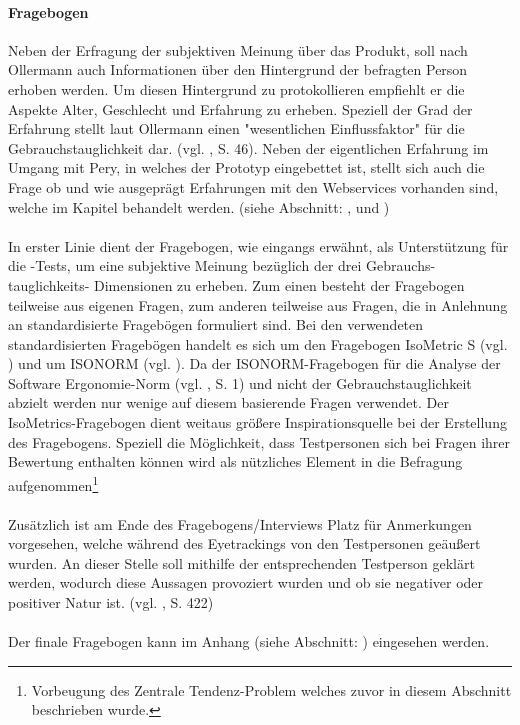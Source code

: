 \documentclass[Bachelorarbeit.tex]{subfiles}
\begin{document}
\paragraph{Fragebogen}
Neben der Erfragung der subjektiven Meinung über das Produkt, soll nach Ollermann auch Informationen über den Hintergrund der befragten Person erhoben werden.
Um diesen Hintergrund zu protokollieren empfiehlt er die Aspekte Alter, Geschlecht und Erfahrung zu erheben.
Speziell der Grad der Erfahrung stellt laut Ollermann einen "wesentlichen Einflussfaktor" für die Gebrauchstauglichkeit dar. (vgl. \cite{Ollermann2007}, S. 46). 
Neben der eigentlichen Erfahrung im Umgang mit Pery, in welches der Prototyp eingebettet ist, stellt sich auch die Frage ob und wie ausgeprägt Erfahrungen mit den Webservices vorhanden sind, welche im Kapitel  behandelt werden. (siehe Abschnitt: ,  und )\\
\\
In erster Linie dient der Fragebogen, wie eingangs erwähnt, als Unterstützung für die -Tests, um eine subjektive Meinung bezüglich der drei Gebrauchs- tauglichkeits- Dimensionen zu erheben. 
Zum einen besteht der Fragebogen teilweise aus eigenen Fragen, zum anderen teilweise aus Fragen, die in Anlehnung an standardisierte Fragebögen formuliert sind.
Bei den verwendeten standardisierten Fragebögen handelt es sich um den Fragebogen IsoMetric S (vgl. \cite{IsoMetricS}) und um ISONORM (vgl. \cite{IsonormL}).
Da der ISONORM-Fragebogen für die Analyse der Software Ergonomie-Norm (vgl. \cite{IsonormL}, S. 1) und nicht der Gebrauchstauglichkeit abzielt werden nur wenige auf diesem basierende Fragen verwendet.
Der IsoMetrics-Fragebogen dient weitaus größere Inspirationsquelle bei der Erstellung des Fragebogens.
Speziell die Möglichkeit, dass Testpersonen sich bei Fragen ihrer Bewertung enthalten können wird als nützliches Element in die Befragung aufgenommen\footnote{Vorbeugung des Zentrale Tendenz-Problem welches zuvor in diesem Abschnitt beschrieben wurde.}\\
\\
Zusätzlich ist am Ende des Fragebogens/Interviews Platz für Anmerkungen vorgesehen, welche während des Eyetrackings von den Testpersonen geäußert wurden.
An dieser Stelle soll mithilfe der entsprechenden Testperson geklärt werden, wodurch diese Aussagen provoziert wurden und ob sie negativer oder positiver Natur ist. (vgl. \cite{Niegemann2008}, S. 422)\\
\\
Der finale Fragebogen kann im Anhang (siehe Abschnitt: ) eingesehen werden.
\end{document}
